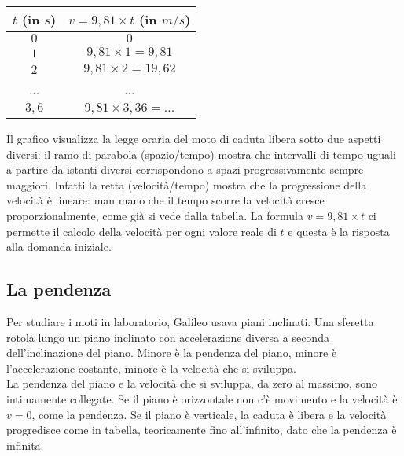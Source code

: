  \begin{center}
\begin{tabular}{cc}\toprule
\(t\) (in \(s\)) & \(v=9,81\times t\) (in \(m/s\)) \\\midrule
\(0\) & \(0\)  \\
\(1\) & \(9,81\times 1 =9,81\) \\
\(2\) & \(9,81\times 2 =19,62\) \\
... & ... \\
\(3,6\) & \(9,81\times 3,36= ...\)\\\bottomrule
\end{tabular}
\label{tab:diff_velocita}
\end{center}

Il grafico visualizza la legge oraria del 
moto di caduta libera sotto due aspetti diversi: il ramo di parabola 
(spazio/tempo) mostra che intervalli di tempo uguali a partire da istanti 
diversi corrispondono a spazi progressivamente sempre maggiori. 
Infatti la retta (velocità/tempo) mostra che la progressione della 
velocità è lineare: man mano che il tempo 
scorre la velocità cresce proporzionalmente, come già si vede dalla tabella.
La formula \(v=9,81\times t\) ci permette il calcolo della velocità per 
ogni valore reale di \(t\) e questa è la risposta alla domanda iniziale. 

\subsection{La pendenza}
\label{subsec:differenziazione_pendenza}
Per studiare i moti in laboratorio, Galileo usava piani inclinati. Una sferetta 
rotola lungo un piano inclinato con accelerazione diversa a seconda 
dell'inclinazione del piano. Minore è la pendenza del piano, minore è 
l'accelerazione costante, minore è la velocità che si sviluppa. \\
La pendenza del 
piano e la velocità che si sviluppa, da zero al massimo, sono intimamente 
collegate. Se il piano è orizzontale non c'è movimento e la velocità è 
\(v=0\), come la pendenza. Se il piano è verticale, la caduta è libera e  
la velocità progredisce come in tabella, teoricamente fino all'infinito, dato 
che la pendenza è infinita.

